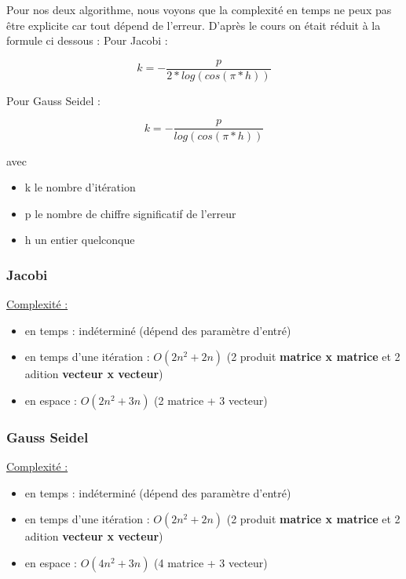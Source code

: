 \documentclass[11pt]{article}
\begin{document}
Pour nos deux algorithme, nous voyons que la complexité en temps ne
peux pas être explicite car tout dépend de l'erreur. D'après le cours
on était réduit à la formule ci dessous :\newline
\vspace{5mm}
Pour Jacobi :

\begin{equation*}
  k = - \frac{p}{2 * log(cos(\pi * h))}
\end{equation*}

Pour Gauss Seidel :

\begin{equation*}
  k = - \frac{p}{log(cos(\pi * h))}
\end{equation*}

avec

\begin{itemize}
\item k le nombre d'itération
\item p le nombre de chiffre significatif de l'erreur
\item h un entier quelconque
\end{itemize}

\subsubsection{Jacobi}

\underline{Complexité :}

\begin{itemize}
\item en temps : indéterminé (dépend des paramètre d'entré)
\item en temps d'une itération : $O(2n^2 + 2n)$ (2 produit \textbf{matrice x
  matrice} et 2 adition \textbf{vecteur x vecteur})
\item en espace : $O(2n^2 + 3n)$ (2 matrice + 3 vecteur)
\end{itemize}

\subsubsection{Gauss Seidel}

\underline{Complexité :}

\begin{itemize}
\item en temps : indéterminé (dépend des paramètre d'entré)
\item en temps d'une itération : $O(2n^2 + 2n)$ (2 produit \textbf{matrice x
  matrice} et 2 adition \textbf{vecteur x vecteur})
\item en espace : $O(4n^2 + 3n)$ (4 matrice + 3 vecteur)
\end{itemize}
\end{document}
